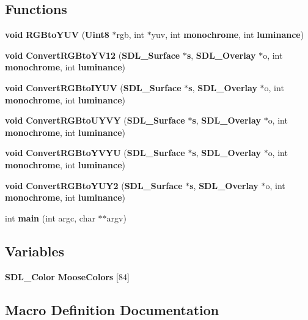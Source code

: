 \subsection*{Functions}
\begin{DoxyCompactItemize}
\item 
{\bf void} {\bf R\+G\+Bto\+Y\+U\+V} ({\bf Uint8} $\ast$rgb, int $\ast$yuv, int {\bf monochrome}, int {\bf luminance})
\item 
{\bf void} {\bf Convert\+R\+G\+Bto\+Y\+V12} ({\bf S\+D\+L\+\_\+\+Surface} $\ast${\bf s}, {\bf S\+D\+L\+\_\+\+Overlay} $\ast$o, int {\bf monochrome}, int {\bf luminance})
\item 
{\bf void} {\bf Convert\+R\+G\+Bto\+I\+Y\+U\+V} ({\bf S\+D\+L\+\_\+\+Surface} $\ast${\bf s}, {\bf S\+D\+L\+\_\+\+Overlay} $\ast$o, int {\bf monochrome}, int {\bf luminance})
\item 
{\bf void} {\bf Convert\+R\+G\+Bto\+U\+Y\+V\+Y} ({\bf S\+D\+L\+\_\+\+Surface} $\ast${\bf s}, {\bf S\+D\+L\+\_\+\+Overlay} $\ast$o, int {\bf monochrome}, int {\bf luminance})
\item 
{\bf void} {\bf Convert\+R\+G\+Bto\+Y\+V\+Y\+U} ({\bf S\+D\+L\+\_\+\+Surface} $\ast${\bf s}, {\bf S\+D\+L\+\_\+\+Overlay} $\ast$o, int {\bf monochrome}, int {\bf luminance})
\item 
{\bf void} {\bf Convert\+R\+G\+Bto\+Y\+U\+Y2} ({\bf S\+D\+L\+\_\+\+Surface} $\ast${\bf s}, {\bf S\+D\+L\+\_\+\+Overlay} $\ast$o, int {\bf monochrome}, int {\bf luminance})
\item 
int {\bf main} (int argc, char $\ast$$\ast$argv)
\end{DoxyCompactItemize}
\subsection*{Variables}
\begin{DoxyCompactItemize}
\item 
{\bf S\+D\+L\+\_\+\+Color} {\bf Moose\+Colors} [84]
\end{DoxyCompactItemize}


\subsection{Macro Definition Documentation}
